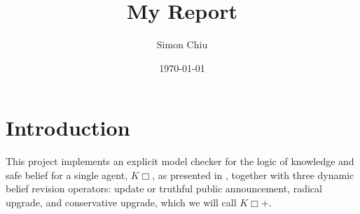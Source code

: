 \documentclass[12pt,a4paper]{article}
\title{My Report}
\author{Simon Chiu}
\date{\today}
\begin{document}
\maketitle

\vfill

\tableofcontents

\clearpage


\section{Introduction}\label{sec:Introduction}
This project implements an explicit model checker for the logic of knowledge and safe belief for a single agent, $K\Box$, as presented in \cite{baltagQualitativeTheoryDynamic2008}, together with three dynamic belief revision operators: update or truthful public announcement, radical upgrade, and conservative upgrade, which we will call $K\Box +$.













\end{document}
